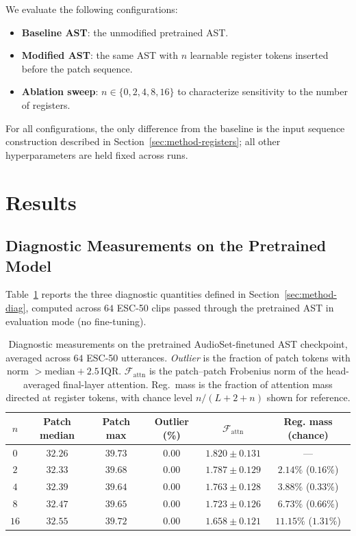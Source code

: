 \documentclass[conference]{IEEEtran}
\begin{document}
We evaluate the following configurations:
\begin{itemize}
    \item \textbf{Baseline AST}: the unmodified pretrained AST.
    \item \textbf{Modified AST}: the same AST with $n$ learnable register tokens inserted before the patch sequence.
    \item \textbf{Ablation sweep}: $n \in \{0, 2, 4, 8, 16\}$ to characterize sensitivity to the number of registers.
\end{itemize}
For all configurations, the only difference from the baseline is the input sequence construction described in Section~\ref{sec:method-registers}; all other hyperparameters are held fixed across runs.

\section{Results}
\label{sec:results}

\subsection{Diagnostic Measurements on the Pretrained Model}
\label{sec:results-diag}

Table~\ref{tab:diagnostic} reports the three diagnostic quantities defined in Section~\ref{sec:method-diag}, computed across $64$ ESC-50 clips passed through the pretrained AST in evaluation mode (no fine-tuning).

\begin{table}[t]
\caption{Diagnostic measurements on the pretrained AudioSet-finetuned AST checkpoint, averaged across $64$ ESC-50 utterances. \emph{Outlier} is the fraction of patch tokens with norm $> \mathrm{median} + 2.5\,\mathrm{IQR}$. $\mathcal{F}_{\text{attn}}$ is the patch--patch Frobenius norm of the head-averaged final-layer attention. Reg.\ mass is the fraction of attention mass directed at register tokens, with chance level $n/(L+2+n)$ shown for reference.}
\label{tab:diagnostic}
\centering
\renewcommand{\arraystretch}{1.18}
\begin{tabular}{c c c c c c}
\toprule
$n$ & Patch median  & Patch max & Outlier (\%) & $\mathcal{F}_{\text{attn}}$ & Reg. mass (chance) \\
\midrule
$0$  & $32.26$ & $39.73$ & $0.00$ & $1.820 \pm 0.131$ & ---  \\
$2$  & $32.33$ & $39.68$ & $0.00$ & $1.787 \pm 0.129$ & $2.14\%$ ($0.16\%$) \\
$4$  & $32.39$ & $39.64$ & $0.00$ & $1.763 \pm 0.128$ & $3.88\%$ ($0.33\%$) \\
$8$  & $32.47$ & $39.65$ & $0.00$ & $1.723 \pm 0.126$ & $6.73\%$ ($0.66\%$) \\
$16$ & $32.55$ & $39.72$ & $0.00$ & $1.658 \pm 0.121$ & $11.15\%$ ($1.31\%$) \\
\bottomrule
\end{tabular}
\end{table}
\end{document}
